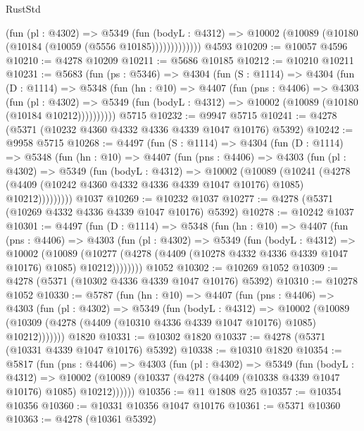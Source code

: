 \begin{lexlean}{RustStd}
\begin{coremodule}
                (fun (pl : @4302) =>
                @5349
                  (fun (bodyL : @4312) =>
                  @10002 (@10089 (@10180 (@10184 (@10059 (@5556 @10185)))))))))))))
    @4593
@10209 := @10057 @4596
@10210 := @4278 @10209
@10211 := @5686 @10185
@10212 := @10210 @10211
@10231 := @5683
    (fun (ps : @5346) =>
    @4304
      (fun (S : @1114) =>
      @4304
        (fun (D : @1114) =>
        @5348
          (fun (hn : @10) =>
          @4407
            (fun (pns : @4406) =>
            @4303
              (fun (pl : @4302) =>
              @5349 (fun (bodyL : @4312) => @10002 (@10089 (@10180 (@10184 @10212))))))))))
    @5715
@10232 := @9947 @5715
@10241 := @4278 (@5371 (@10232 @4360 @4332 @4336 @4339 @1047 @10176) @5392)
@10242 := @9958 @5715
@10268 := @4497
    (fun (S : @1114) =>
    @4304
      (fun (D : @1114) =>
      @5348
        (fun (hn : @10) =>
        @4407
          (fun (pns : @4406) =>
          @4303
            (fun (pl : @4302) =>
            @5349
              (fun (bodyL : @4312) =>
              @10002
                (@10089
                  (@10241
                    (@4278
                      (@4409 (@10242 @4360 @4332 @4336 @4339 @1047 @10176) @1085)
                      @10212)))))))))
    @1037
@10269 := @10232 @1037
@10277 := @4278 (@5371 (@10269 @4332 @4336 @4339 @1047 @10176) @5392)
@10278 := @10242 @1037
@10301 := @4497
    (fun (D : @1114) =>
    @5348
      (fun (hn : @10) =>
      @4407
        (fun (pns : @4406) =>
        @4303
          (fun (pl : @4302) =>
          @5349
            (fun (bodyL : @4312) =>
            @10002
              (@10089
                (@10277 (@4278 (@4409 (@10278 @4332 @4336 @4339 @1047 @10176) @1085) @10212))))))))
    @1052
@10302 := @10269 @1052
@10309 := @4278 (@5371 (@10302 @4336 @4339 @1047 @10176) @5392)
@10310 := @10278 @1052
@10330 := @5787
    (fun (hn : @10) =>
    @4407
      (fun (pns : @4406) =>
      @4303
        (fun (pl : @4302) =>
        @5349
          (fun (bodyL : @4312) =>
          @10002
            (@10089 (@10309 (@4278 (@4409 (@10310 @4336 @4339 @1047 @10176) @1085) @10212)))))))
    @1820
@10331 := @10302 @1820
@10337 := @4278 (@5371 (@10331 @4339 @1047 @10176) @5392)
@10338 := @10310 @1820
@10354 := @5817
    (fun (pns : @4406) =>
    @4303
      (fun (pl : @4302) =>
      @5349
        (fun (bodyL : @4312) =>
        @10002 (@10089 (@10337 (@4278 (@4409 (@10338 @4339 @1047 @10176) @1085) @10212))))))
@10356 := @11 @1808 @25
@10357 := @10354 @10356
@10360 := @10331 @10356 @1047 @10176
@10361 := @5371 @10360
@10363 := @4278 (@10361 @5392)

\end{coremodule}
\end{lexlean}
